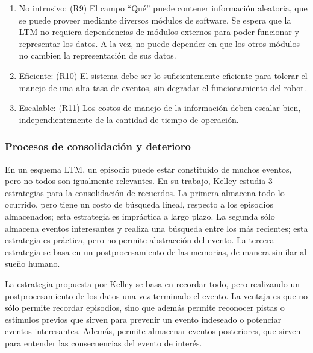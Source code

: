 \begin{enumerate}[topsep=0pt]
\setlength\itemsep{0.2em}
\item No intrusivo: (R9) El campo ``Qué'' puede contener información aleatoria, que se puede proveer mediante diversos módulos de software. Se espera que la LTM no requiera dependencias de módulos externos para poder funcionar y representar los datos. A la vez, no puede depender en que los otros módulos no cambien la representación de sus datos.

\item Eficiente: (R10) El sistema debe ser lo suficientemente eficiente para tolerar el manejo de una alta tasa de eventos, sin degradar el funcionamiento del robot.

\item Escalable: (R11) Los costos de manejo de la información deben escalar bien, independientemente de la cantidad de tiempo de operación.
\end{enumerate}



\subsubsection{Procesos de consolidación y deterioro}
%

En un esquema LTM, un episodio puede estar constituido de muchos eventos, pero no todos son igualmente relevantes. En su trabajo, Kelley \cite{Kelley2014} estudia 3 estrategias para la consolidación de recuerdos. La primera almacena todo lo ocurrido, pero tiene un costo de búsqueda lineal, respecto a los episodios almacenados; esta estrategia es impráctica a largo plazo. La segunda sólo almacena eventos interesantes y realiza una búsqueda entre los más recientes; esta estrategia es práctica, pero no permite abstracción del evento. La tercera estrategia se basa en un postprocesamiento de las memorias, de manera similar al sue\~no humano.

La estrategia propuesta por Kelley se basa en recordar todo, pero realizando un postprocesamiento de los datos una vez terminado el evento. La ventaja es que no sólo permite recordar episodios, sino que además permite reconocer pistas o estímulos previos que sirven para prevenir un evento indeseado o potenciar eventos interesantes. Además, permite almacenar eventos posteriores, que sirven para entender las consecuencias del evento de interés. 


